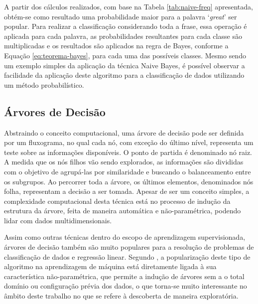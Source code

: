 \documentclass[oneside,openright,12pt]{ufsm_2015} %
\begin{document}
    \par A partir dos cálculos realizados, com base na Tabela \ref{tab:naive-freq} apresentada, obtém-se como resultado uma probabilidade maior para a palavra `\textit{great}' ser popular. Para realizar a classificação considerando toda a frase, essa operação é aplicada para cada palavra, as probabilidades resultantes para cada classe são multiplicadas e os resultados são aplicados na regra de Bayes, conforme a Equação \ref{eq:teorema-bayes}, para cada uma das possíveis classes. Mesmo sendo um exemplo simples da aplicação da técnica Naive Bayes, é possível observar a facilidade da aplicação deste algoritmo para a classificação de dados utilizando um método probabilístico.


\subsection{Árvores de Decisão}
\label{sec:arvores-decisao}

    \par Abstraindo o conceito computacional, uma árvore de decisão pode ser definida por um fluxograma, no qual cada nó, com exceção do último nível, representa um teste sobre as informações disponíveis. O ponto de partida é denominado nó raiz. A medida que os nós filhos vão sendo explorados, as informações são divididas com o objetivo de agrupá-las por similaridade e buscando o balanceamento entre os subgrupos. Ao percorrer toda a árvore, os últimos elementos, denominados nós folha, representam a decisão a ser tomada. Apesar de ser um conceito simples, a complexidade computacional desta técnica está no processo de indução da estrutura da árvore, feita de maneira automática e não-paramétrica, podendo lidar com dados multidimensionais. 
    
    \par Assim como outras técnicas dentro do escopo de aprendizagem supervisionada, árvores de decisão também são muito populares para a resolução de problemas de classificação de dados e regressão linear. Segundo \cite{book:han:11}, a popularização deste tipo de algoritmo na aprendizagem de máquina está diretamente ligada à sua característica não-paramétrica, que permite a indução de árvores sem a o total domínio ou configuração prévia dos dados, o que torna-se muito interessante no âmbito deste trabalho no que se refere à descoberta de maneira exploratória.
    
\end{document}
